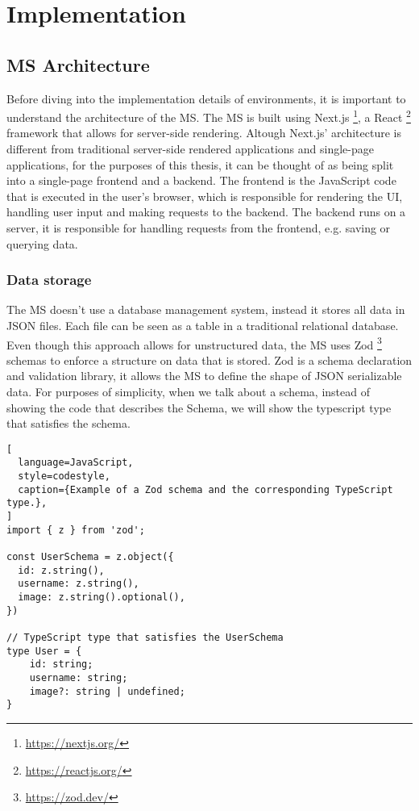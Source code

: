 \chapter{Implementation}
\label{cha:implementation}

\section {MS Architecture}

Before diving into the implementation details of environments, it is important to
understand the architecture of the MS.
The MS is built using Next.js \footnote{\url{https://nextjs.org/}}, a React \footnote{\url{https://reactjs.org/}}
framework that allows for server-side rendering.
Altough Next.js' architecture is different from traditional server-side rendered
applications and single-page applications,
for the purposes of this thesis,
it can be thought of as being split into a single-page frontend and a backend.
The frontend is the JavaScript code that is executed in the user's browser, which is
responsible for rendering the UI, handling user input and making requests to the backend.
The backend runs on a server, it is responsible for handling requests from the frontend,
e.g. saving or querying data.

\subsection{Data storage}


The MS doesn't use a database management system, instead it stores all data in JSON files.
Each file can be seen as a table in a traditional relational database.
Even though this approach allows for unstructured data, the MS uses 
Zod \footnote{\url{https://zod.dev/}} schemas to enforce a structure on
data that is stored.
Zod is a schema declaration and validation library, it allows the MS to define the shape
of JSON serializable data.
For purposes of simplicity, when we talk about a schema, instead of showing the code that
describes the Schema, we will show the typescript type that satisfies the schema.

\begin{lstlisting}[
  language=JavaScript,
  style=codestyle,
  caption={Example of a Zod schema and the corresponding TypeScript type.},
]
import { z } from 'zod';

const UserSchema = z.object({
  id: z.string(),
  username: z.string(),
  image: z.string().optional(),
})

// TypeScript type that satisfies the UserSchema
type User = {
    id: string;
    username: string;
    image?: string | undefined;
}
\end{lstlisting}

